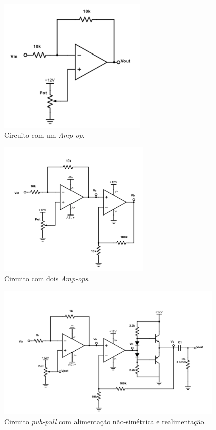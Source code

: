     \begin{figure}[h!]
        \centering
        \includegraphics[height=6.5cm]{imgSource/circuits/ampOp1.png}
        \caption{Circuito com um \emph{Amp-op}.}
        \label{fig:circ2}
    \end{figure}
    
    \begin{figure}[h!]
        \centering
        \includegraphics[height=6.5cm]{imgSource/circuits/ampOp2.png}
        \caption{Circuito com dois \emph{Amp-ops}.}
        \label{fig:circ3}
    \end{figure}
    
    \begin{figure}[h!]
        \centering
        \includegraphics[height=6.5cm]{imgSource/circuits/ampOpPush.png}
        \caption{Circuito \emph{puh-pull} com alimentação não-simétrica e realimentação.}
        \label{fig:circ4}
    \end{figure}
    
